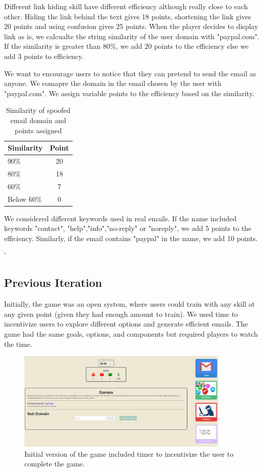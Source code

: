 Different link hiding skill have different efficiency although really close to each other. Hiding the link behind the text gives 18 points, shortening the link gives 20 points and using confusion gives 25 points. When the player decides to display link as is, we calcualte the string similarity of the user domain with "paypal.com". If the similarity is greater than 80\%, we add 20 points to the efficiency else we add 3 points to efficiency.

We want to encourage users to notice that they can pretend to send the email as anyone. We comapre the domain in the email chosen by the user with "paypal.com". We assign variable points to the efficiency based on the similarity.

\begin{table}[h!]
    \centering
    \begin{tabular}{l c}
        Similarity & Point \\
        \hline
        90\%       & 20    \\
        80\%       & 18    \\
        60\%       & 7     \\
        Below 60\% & 0     \\
    \end{tabular}%
    \caption{Similarity of spoofed email domain and points assigned}
    \label{tab:similarity_spoofed}
\end{table}

We considered different keywords used in real emails. If the name included keywords "contact", "help","info","no-reply" or "noreply", we add 5 points to the efficiency. Similarly, if the email contains "paypal" in the name, we add 10 points.

'\subsection{Previous Iteration}
Initially, the game was an open system, where users could train with any skill at any given point (given they had enough amount to train). We used time to incentivize users to explore different options and generate efficient emails. The game had the same goals, options, and components but required players to watch the time.

\begin{figure}[ht]
    \centering
    \includegraphics[width=0.9\textwidth]{figures/section2/game_initial.png}
    \caption[Initial version of the game]{Initial version of the game included timer to incentivize the user to complete the game.}
\end{figure}

